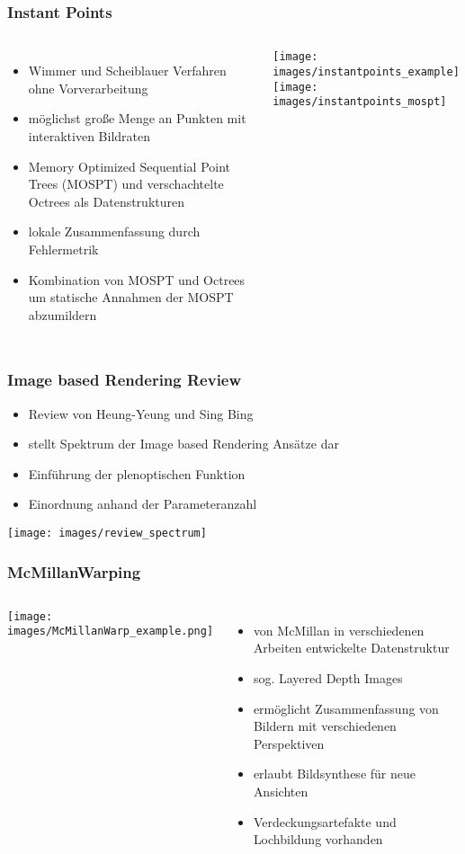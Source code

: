 \documentclass[aspectratio=169]{beamer}
\begin{document}
\begin{frame}
    \frametitle{Instant Points}
    \begin{columns}
        \begin{itemize}
            \item Wimmer und Scheiblauer Verfahren ohne Vorverarbeitung
            \item möglichst große Menge an Punkten mit interaktiven Bildraten
            \item Memory Optimized
            Sequential Point Trees (MOSPT) und verschachtelte Octrees als Datenstrukturen
            \item lokale Zusammenfassung durch Fehlermetrik
            \item Kombination von MOSPT und Octrees um statische Annahmen der MOSPT abzumildern
        \end{itemize}

    \texttt{[image: images/instantpoints\_example]}
    \centering
    \texttt{[image: images/instantpoints\_mospt]}
    \end{columns}
\end{frame}

\begin{frame}
    \frametitle{Image based Rendering Review}
    \begin{itemize}
        \item Review von Heung-Yeung und Sing Bing
        \item stellt Spektrum der Image based Rendering Ansätze dar
        \item Einführung der plenoptischen Funktion
        \item Einordnung anhand der Parameteranzahl
    \end{itemize}
    \texttt{[image: images/review\_spectrum]}
\end{frame}

\begin{frame}
    \frametitle{McMillanWarping}
    \begin{columns}
    \texttt{[image: images/McMillanWarp\_example.png]}

        \begin{itemize}
            \item von McMillan in verschiedenen Arbeiten entwickelte Datenstruktur
            \item sog. Layered Depth Images
            \item ermöglicht Zusammenfassung von Bildern mit verschiedenen Perspektiven
            \item erlaubt Bildsynthese für neue Ansichten
            \item Verdeckungsartefakte und Lochbildung vorhanden
        \end{itemize}
    \end{columns}
\end{frame}
\end{document}
